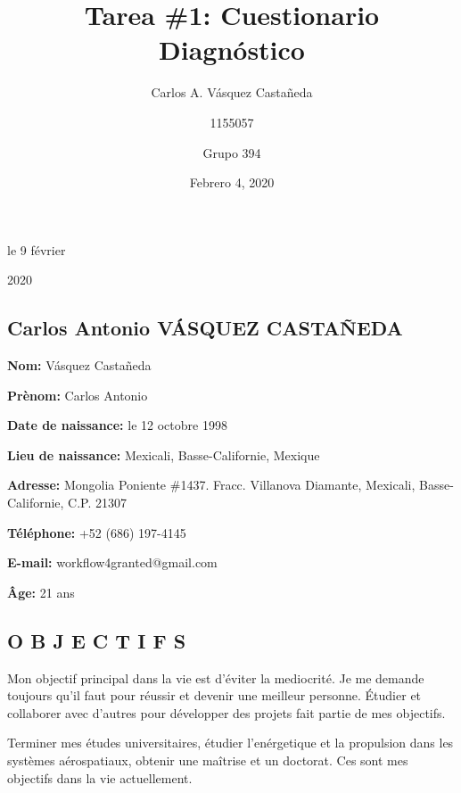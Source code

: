 \documentclass[12pt, letterpaper]{article}
\title{Tarea \#1: Cuestionario Diagnóstico}
\author{Carlos A. Vásquez Castañeda \and 1155057 \and Grupo 394}
\date{Febrero 4, 2020}
\begin{document}

\begin{shaded}

\begin{flushleft}
	le 9 février
\end{flushleft}
	\begin{flushleft}
		\vspace{-0.6cm}
		\hspace{0.4cm}
		2020
	\end{flushleft}
\begin{flushright}
	\vspace{-2.5cm}
\section*{Carlos Antonio VÁSQUEZ CASTAÑEDA}
\end{flushright}
\end{shaded}

\textbf{Nom:} Vásquez Castañeda

\textbf{Prènom:} Carlos Antonio

\textbf{Date de naissance:} le 12 octobre 1998

\textbf{Lieu de naissance:} Mexicali, Basse-Californie, Mexique

\textbf{Adresse:} Mongolia Poniente \#1437. Fracc. Villanova Diamante, Mexicali, Basse-Californie, C.P. 21307

\textbf{Téléphone:} +52 (686) 197-4145

\textbf{E-mail:} workflow4granted@gmail.com

\textbf{Âge:} 21 ans

\subsection*{\textcolor{title}{O B J E C T I F S}}
Mon objectif principal dans la vie est d'éviter la mediocrité. Je me demande toujours qu'il faut pour réussir et devenir une meilleur personne. Étudier et collaborer avec d'autres pour développer des projets fait partie de mes objectifs.

Terminer mes études universitaires, étudier l'enérgetique et la propulsion dans les systèmes aérospatiaux, obtenir une maîtrise et un doctorat. Ces sont mes objectifs dans la vie actuellement.
\end{document}
